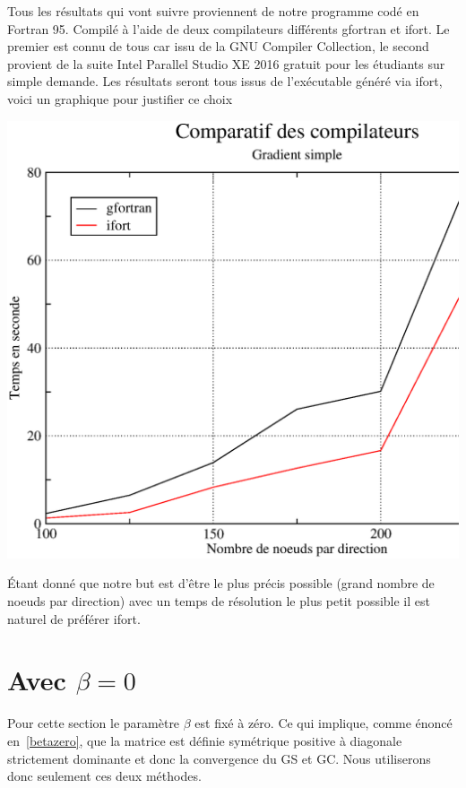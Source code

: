 \documentclass[twoside,12pt]{report}
\theoremstyle{remark}
\begin{document}
Tous les résultats qui vont suivre proviennent de notre programme codé en Fortran 95. Compilé à l'aide de deux compilateurs différents gfortran et ifort. Le premier est connu de tous car issu de la GNU Compiler Collection, le second provient de la suite Intel Parallel Studio XE 2016 gratuit pour les étudiants sur simple demande. Les résultats seront tous issus de l’exécutable généré via ifort, voici un graphique pour justifier ce choix

\begin{center}
\includegraphics[scale=0.50]{image/gfortranifort.eps}
\end{center}

Étant donné que notre but est d'être le plus précis possible (grand nombre de noeuds par direction) avec un temps de résolution le plus petit possible il est naturel de préférer ifort.

\section{Avec \texorpdfstring{$\beta =0$}{B}}

Pour cette section le paramètre $\beta$ est fixé à zéro. Ce qui implique, comme énoncé en~\ref{betazero}, que la matrice est définie symétrique positive à diagonale strictement dominante et donc la convergence du GS et GC\@. Nous utiliserons donc seulement ces deux méthodes.
\end{document}
